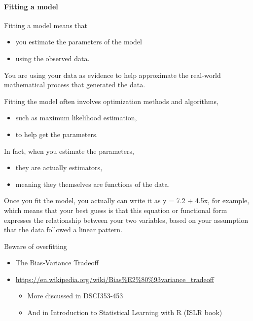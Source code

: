 \documentclass[]{article}
\providecommand{\tightlist}{%
  \setlength{\itemsep}{0pt}\setlength{\parskip}{0pt}}
\let\oldparagraph\paragraph
\renewcommand{\paragraph}[1]{\oldparagraph{#1}\mbox{}}
\begin{document}
\paragraph{Fitting a model}\label{fitting-a-model}

Fitting a model means that

\begin{itemize}
\tightlist
\item
  you estimate the parameters of the model
\item
  using the observed data.
\end{itemize}

You are using your data as evidence to help approximate the real-world
mathematical process that generated the data.

Fitting the model often involves optimization methods and algorithms,

\begin{itemize}
\tightlist
\item
  such as maximum likelihood estimation,
\item
  to help get the parameters.
\end{itemize}

In fact, when you estimate the parameters,

\begin{itemize}
\tightlist
\item
  they are actually estimators,
\item
  meaning they themselves are functions of the data.
\end{itemize}

Once you fit the model, you actually can write it as y = 7.2 + 4.5x, for
example, which means that your best guess is that this equation or
functional form expresses the relationship between your two variables,
based on your assumption that the data followed a linear pattern.

Beware of overfitting

\begin{itemize}
\tightlist
\item
  The Bias-Variance Tradeoff
\item
  \url{https://en.wikipedia.org/wiki/Bias\%E2\%80\%93variance_tradeoff}

  \begin{itemize}
  \tightlist
  \item
    More discussed in DSCI353-453
  \item
    And in Introduction to Statistical Learning with R (ISLR book)
  \end{itemize}
\end{itemize}
\end{document}
